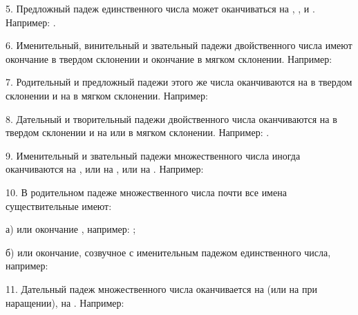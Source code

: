\documentclass[11pt,a4paper,oneside]{memoir}
\begin{document}
    5. Предложный падеж единственного числа может оканчиваться на {}, {}, и {}. Например: {}.
    
    6. Именительный, винительный и звательный падежи двойственного числа имеют окончание {} в твердом склонении и окончание {} в мягком склонении. Например:
    
    \bigskip{}

    7. Родительный и предложный падежи этого же числа оканчиваются на {} в твердом склонении и на {} в мягком склонении. Например:
    
    \bigskip{}

    8. Дательный и творительный падежи двойственного числа оканчиваются на {} в твердом склонении и на {} или {} в мягком склонении. Например: {}.
    
    9. Именительный и звательный падежи множественного числа иногда оканчиваются на {}, или на {}, или на {}. Например:
    
    \bigskip{}

    10. В родительном падеже множественного числа почти все имена существительные имеют:
    
    а) или окончание {}, например: {};
    
    б) или окончание, созвучное с именительным падежом единственного числа, например:
    
    \bigskip{}

    11. Дательный падеж множественного числа оканчивается на {} (или на {} при наращении), на {}. Например:
    
\end{document}
